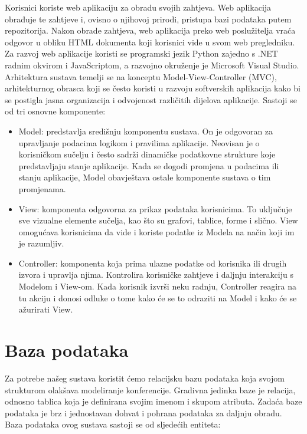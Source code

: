 		Korisnici koriste web aplikaciju za obradu svojih zahtjeva. Web aplikacija obrađuje te zahtjeve i, ovisno o njihovoj prirodi, pristupa bazi podataka putem repozitorija. Nakon obrade zahtjeva, web aplikacija preko web poslužitelja vraća odgovor u obliku HTML dokumenta koji korisnici vide u svom web pregledniku. Za razvoj web aplikacije koristi se programski jezik Python zajedno s .NET radnim okvirom i JavaScriptom, a razvojno okruženje je Microsoft Visual Studio. Arhitektura sustava temelji se na konceptu Model-View-Controller (MVC), arhitekturnog obrasca koji se često koristi u razvoju softverskih aplikacija kako bi se postigla jasna organizacija i odvojenost različitih dijelova aplikacije. Sastoji se od tri osnovne komponente:
	\begin{itemize}
		\item {Model: predstavlja središnju komponentu sustava. On je odgovoran za upravljanje podacima logikom i pravilima aplikacije. Neovisan je o korisničkom sučelju i često sadrži dinamičke podatkovne strukture koje predstavljaju stanje aplikacije. Kada se dogodi promjena u podacima ili stanju aplikacije, Model obavještava ostale komponente sustava o tim promjenama.}
		\item {View: komponenta odgovorna za prikaz podataka korisnicima. To uključuje sve vizualne elemente sučelja, kao što su grafovi, tablice, forme i slično. View omogućava korisnicima da vide i koriste podatke iz Modela na način koji im je razumljiv.}
		\item {Controller: komponenta koja prima ulazne podatke od korisnika ili drugih izvora i upravlja njima. Kontrolira korisničke zahtjeve i daljnju interakciju s Modelom i View-om. Kada korisnik izvrši neku radnju, Controller reagira na tu akciju i donosi odluke o tome kako će se to odraziti na Model i kako će se ažurirati View.}
	\end{itemize}

	
\section{Baza podataka}
					
	Za potrebe našeg sustava koristit ćemo relacijsku bazu podataka koja svojom strukturom olakšava modeliranje konferencije. Gradivna jedinka baze je 				relacija, odnosno tablica koja je definirana svojim imenom i skupom atributa. Zadaća baze podataka je brz i jednostavan dohvat i pohrana podataka za 			daljnju obradu. Baza podataka ovog sustava sastoji se od sljedećih entiteta:

